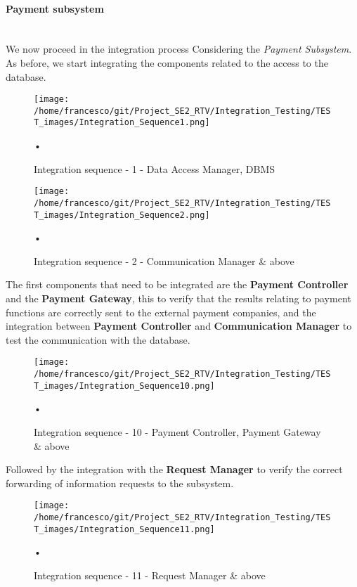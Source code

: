 \documentclass[10pt, a4paper,titlepage]{article}
\begin{document}
\paragraph{Payment subsystem}\mbox{}\\
We now proceed in the integration process Considering the \emph{Payment Subsystem}.
As before, we start integrating the components related to the access to the database.
\begin{figure}[h]
\begin{center}
\texttt{[image: /home/francesco/git/Project\_SE2\_RTV/Integration\_Testing/TEST\_images/Integration\_Sequence1.png]}
\caption{Integration sequence - 1 - Data Access Manager, DBMS}
\label{fig:int_seq1_2}
\end{center}•
\end{figure}
\begin{figure}[h]
\begin{center}
\texttt{[image: /home/francesco/git/Project\_SE2\_RTV/Integration\_Testing/TEST\_images/Integration\_Sequence2.png]}
\caption{Integration sequence - 2 - Communication Manager \& above}
\label{fig:int_seq2_2}
\end{center}•
\end{figure}
\pagebreak
The first components that need to be integrated are the \textbf{Payment Controller} and the \textbf{Payment Gateway}, this to verify that the results relating to payment functions are correctly sent to the external payment companies, and the integration between \textbf{Payment Controller} and \textbf{Communication Manager} to test the communication with the database.
\begin{figure}[h]
\begin{center}
\texttt{[image: /home/francesco/git/Project\_SE2\_RTV/Integration\_Testing/TEST\_images/Integration\_Sequence10.png]}
\caption{Integration sequence - 10 - Payment Controller, Payment Gateway \& above}
\label{fig:int_seq10}
\end{center}•
\end{figure}
Followed by the integration with the \textbf{Request Manager} to verify the correct forwarding of information requests to the subsystem.
\begin{figure}[h]
\begin{center}
\texttt{[image: /home/francesco/git/Project\_SE2\_RTV/Integration\_Testing/TEST\_images/Integration\_Sequence11.png]}
\caption{Integration sequence - 11 - Request Manager \& above}
\label{fig:int_seq11}
\end{center}•
\end{figure}
\end{document}

